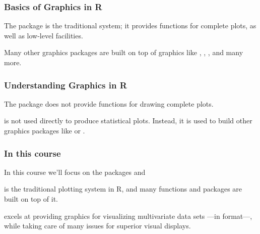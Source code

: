 \documentclass[12pt]{beamer}\usepackage[]{graphicx}\usepackage[]{color}
\begin{document}
\begin{frame}[fragile]
\begin{center}
\end{center}
\end{frame}


\begin{frame}
\frametitle{Basics of Graphics in R}

The package  is the traditional system; it provides functions for complete plots, as well as low-level facilities. 

\bigskip
Many other graphics packages are built on top of graphics like , , , and many more.
\eb

\end{frame}


\begin{frame}
\frametitle{Understanding Graphics in R}

The  package does not provide functions for drawing complete plots.

\bigskip
{} is not used directly to produce statistical plots. Instead, it is used to build other graphics packages like  or .
\eb

\end{frame}


\begin{frame}
\frametitle{In this course}

\bbi
 \item In this course we'll focus on the packages {\hilit {}} and {\hilit {}}
 \item {} is the traditional plotting system in R, and many functions and packages are built on top of it.
 \item {} excels at providing graphics for visualizing multivariate data sets ---in  format---, while taking care of many issues for superior visual displays.
\ei

\end{frame}

\end{document}

